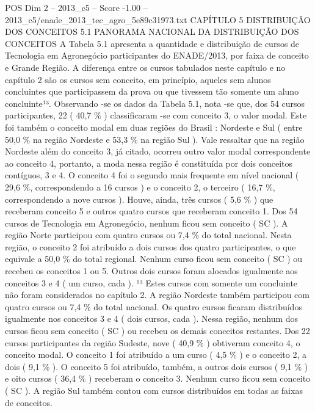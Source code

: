 \begin{textsample}{POS Dim 2 – 2013\_c5 – Score -1.00 – 2013\_c5/enade\_2013\_tec\_agro\_5e89c31973.txt}  \label{ex:f2_pos_367}
CAPÍTULO 5 DISTRIBUIÇÃO DOS CONCEITOS 5.1 PANORAMA NACIONAL DA DISTRIBUIÇÃO DOS CONCEITOS A Tabela 5.1 apresenta a quantidade e distribuição de cursos de Tecnologia em Agronegócio participantes do ENADE/2013, por faixa de conceito e Grande Região.
A diferença entre os cursos tabulados neste capítulo e no capítulo 2 são os cursos sem conceito, em princípio, aqueles sem alunos concluintes que participassem da prova ou que tivessem tão somente um aluno concluinte¹³.
Observando -se os dados da Tabela 5.1, nota -se que, dos 54 cursos participantes, 22 ( 40,7 \% ) classificaram -se com conceito 3, o valor modal.
Este foi também o conceito modal em duas regiões do Brasil : Nordeste e Sul ( entre 50,0 \% na região Nordeste e 53,3 \% na região Sul ).
Vale ressaltar que na região Nordeste além do conceito 3, já citado, ocorreu outro valor modal correspondente ao conceito 4, portanto, a moda nessa região é constituída por dois conceitos contíguos, 3 e 4.
O conceito 4 foi o segundo mais frequente em nível nacional ( 29,6 \%, correspondendo a 16 cursos ) e o conceito 2, o terceiro ( 16,7 \%, correspondendo a nove cursos ).
Houve, ainda, três cursos ( 5,6 \% ) que receberam conceito 5 e outros quatro cursos que receberam conceito 1.
Dos 54 cursos de Tecnologia em Agronegócio, nenhum ficou sem conceito ( SC ).
A região Norte participou com quatro cursos ou 7,4 \% do total nacional.
Nesta região, o conceito 2 foi atribuído a dois cursos dos quatro participantes, o que equivale a 50,0 \% do total regional.
Nenhum curso ficou sem conceito ( SC ) ou recebeu os conceitos 1 ou 5.
Outros dois cursos foram alocados igualmente aos conceitos 3 e 4 ( um curso, cada ). ¹³ Estes cursos com somente um concluinte não foram considerados no capítulo 2.
A região Nordeste também participou com quatro cursos ou 7,4 \% do total nacional.
Os quatro cursos ficaram distribuídos igualmente nos conceitos 3 e 4 ( dois cursos, cada ).
Nessa região, nenhum dos cursos ficou sem conceito ( SC ) ou recebeu os demais conceitos restantes.
Dos 22 cursos participantes da região Sudeste, nove ( 40,9 \% ) obtiveram conceito 4, o conceito modal.
O conceito 1 foi atribuído a um curso ( 4,5 \% ) e o conceito 2, a dois ( 9,1 \% ).
O conceito 5 foi atribuído, também, a outros dois cursos ( 9,1 \% ) e oito cursos ( 36,4 \% ) receberam o conceito 3.
Nenhum curso ficou sem conceito ( SC ).
A região Sul também contou com cursos distribuídos em todas as faixas de conceitos.

\end{textsample}
